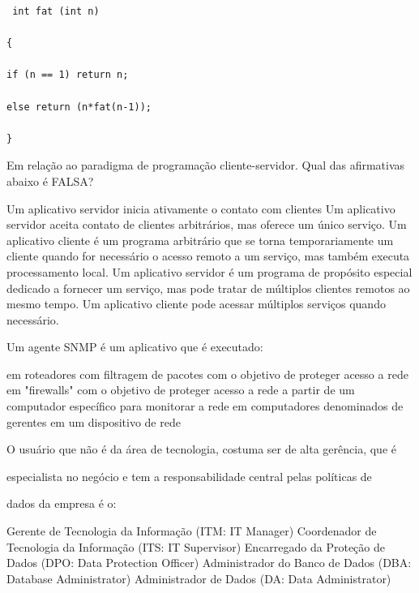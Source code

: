 \documentclass[12pt, addpoints]{exam}
\begin{document}
\begin{questions}
\begin{verbatim} int fat (int n) 

{ 

if (n == 1) return n; 

else return (n*fat(n-1)); 

} 

\end{verbatim}
\begin{choices}
\end{choices}

\question

Em relação ao paradigma de programação cliente-servidor. Qual das afirmativas abaixo é FALSA?
\begin{choices}
\choice Um aplicativo servidor inicia ativamente o contato com clientes 
\choice Um aplicativo servidor aceita contato de clientes arbitrários, mas oferece um único serviço. 
\choice Um aplicativo cliente é um programa arbitrário que se torna temporariamente um cliente quando for necessário o acesso remoto a um serviço, mas também executa processamento local.
\choice Um aplicativo servidor é um programa de propósito especial dedicado a fornecer um serviço, mas pode tratar de múltiplos clientes remotos ao mesmo tempo. 
\choice Um aplicativo cliente pode acessar múltiplos serviços quando necessário.
\end{choices}

\question

Um agente SNMP é um aplicativo que é executado:
\begin{choices}
\choice em roteadores com filtragem de pacotes com o objetivo de proteger acesso a rede
\choice em "firewalls" com o objetivo de proteger acesso a rede
\choice a partir de um computador específico para monitorar a rede
\choice em computadores denominados de gerentes
\choice em um dispositivo de rede
\end{choices}

\question

O usuário que não é da área de tecnologia, costuma ser de alta gerência, que é

especialista no negócio e tem a responsabilidade central pelas políticas de

dados da empresa é o:
\begin{choices}
\choice Gerente de Tecnologia da Informação (ITM: IT Manager)
\choice Coordenador de Tecnologia da Informação (ITS: IT Supervisor)
\choice Encarregado da Proteção de Dados (DPO: Data Protection Officer)
\choice Administrador do Banco de Dados (DBA: Database Administrator)
\choice Administrador de Dados (DA: Data Administrator)
\end{choices}


\end{questions}
\end{document}
